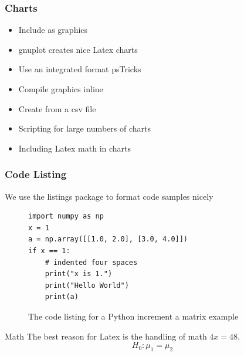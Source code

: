 \documentclass[screen, aspectratio=43]{beamer}
\begin{document}
\begin{frame}
  \frametitle{Charts}
  \begin{itemize}
      \item Include as graphics
      \item gnuplot creates nice Latex charts
      \item Use an integrated format psTricks   
      \item Compile graphics inline
      \item Create from a csv file
      \item Scripting for large numbers of charts
      \item Including Latex math in charts
  \end{itemize}
  
    \note{\\
   \\
    }

\end{frame}

\begin{frame}[fragile]
  \frametitle{Code Listing}
We use the listings package to format code samples nicely

  \begin{figure}[tp] 
  \centering
\lstset{language=Python}
\begin{lstlisting}
import numpy as np
x = 1
a = np.array([[1.0, 2.0], [3.0, 4.0]])
if x == 1:
    # indented four spaces
    print("x is 1.")
    print("Hello World")
    print(a)
\end{lstlisting}
  \caption[Python code example]{The code listing for a Python increment a matrix example}
  \label{fig:PythonCode}
\end{figure}

    \note{\\
   \\
    }

\end{frame}

\begin{frame}{Math}
The best reason for Latex is the handling of math $4x = 48 $.
\begin{equation} 
\label{H0mean}
    H_0 : \mu_1 = \mu_2
\end{equation}
\end{frame}
\end{document}
